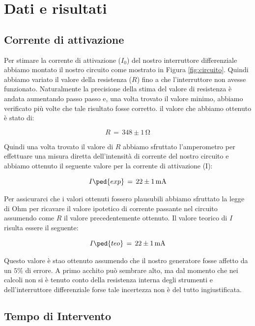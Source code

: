 \section*{Dati e risultati}

\subsection*{Corrente di attivazione}

Per stimare la corrente di attivazione ($I_0$) del nostro interruttore differenziale abbiamo montato il nostro circuito come mostrato in Figura \ref{fig:circuito}.
Quindi abbiamo variato il valore della resistenza ($R$) fino a che l'interruttore non avesse funzionato.
Naturalmente la precisione della stima del valore di resistenza è andata aumentando passo passo e, una volta trovato il valore minimo, abbiamo verificato più volte che tale risultato fosse corretto.
il valore che abbiamo ottenuto è stato di:

\begin{equation}
        R \,=\, 348 \pm 1 \,\si{\ohm}
\end{equation}

Quindi una volta trovato il valore di $R$ abbiamo sfruttato l'amperometro per effettuare una misura diretta dell'intensità di corrente del nostro circuito e abbiamo ottenuto il seguente valore per la corrente di attivazione (I):

\begin{equation}
        I\ped{exp} \,=\, 22 \pm 1 \,\si{\milli\ampere}
\end{equation}

Per assicurarci che i valori ottenuti fossero plausubili abbiamo sfruttato la legge di Ohm per ricavare il valore ipotetico di corrente passante nel circuito assumendo come $R$ il valore precedentemente ottenuto. Il valore teorico di $I$ risulta essere il seguente:

\begin{equation}
        I\ped{teo} \,=\, 22 \pm 1 \,\si{\milli\ampere}
\end{equation}

Questo valore è stao ottenuto assumendo che il nostro generatore fosse affetto da un $5\%$ di errore. A primo acchito può sembrare alto, ma dal momento che nei calcoli non si è tenuto conto della resistenza interna degli strumenti e dell'interruttore differenziale forse tale incertezza non è del tutto ingiustificata.

\subsection*{Tempo di Intervento}

